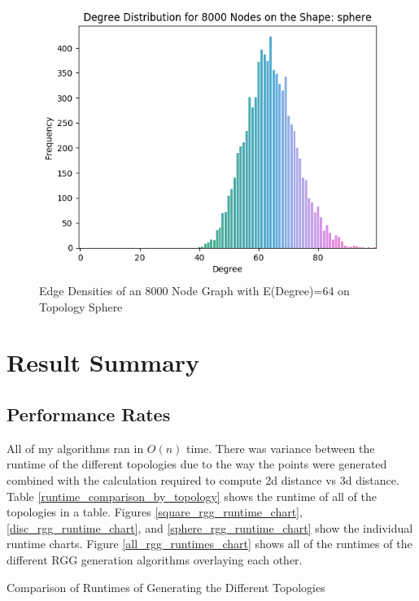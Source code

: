 \documentclass{article}
\begin{document}
    \begin{figure}[H]
      \label{sphere_edge_density}
      \includegraphics[width=1 \textwidth]{sphere/edge_density/8000_64.png}
      \caption{Edge Densities of an 8000 Node Graph with E(Degree)=64 on Topology Sphere}
    \end{figure}

\section{Result Summary}
  \subsection{Performance Rates}
  All of my algorithms ran in $O(n)$ time.
  There was variance between the runtime of the different topologies due to the way the points were generated combined with the calculation required to compute 2d distance vs 3d distance.
  Table \ref{runtime_comparison_by_topology} shows the runtime of all of the topologies in a table.
  Figures \ref{square_rgg_runtime_chart}, \ref{disc_rgg_runtime_chart}, and \ref{sphere_rgg_runtime_chart} show the individual runtime charts.
  Figure \ref{all_rgg_runtimes_chart} shows all of the runtimes of the different RGG generation algorithms overlaying each other.

  \begin{center}
	  \begin{table}
      \label{runtime_comparison_by_topology}
		  \caption{Comparison of Runtimes of Generating the Different Topologies}
	  \end{table}
  \end{center}
\end{document}
